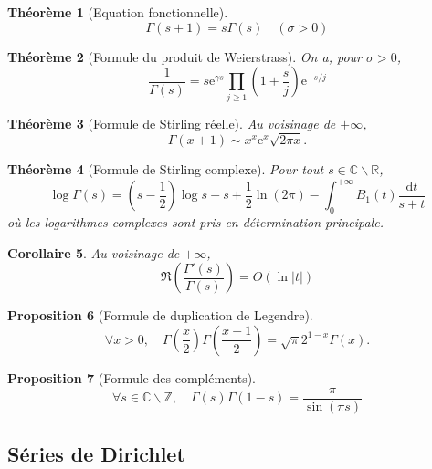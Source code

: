 \documentclass[french]{report}
\newtheorem{theorem}{Théorème}[section]
\newtheorem{proposition}[theorem]{Proposition}
\newtheorem{corollary}[theorem]{Corollaire}
\begin{document}
\begin{theorem}[Equation fonctionnelle]\label{thm:gamma-equation-fonctionnelle}
  \[
    \Gamma(s+1)=s\Gamma(s)\quad(\sigma>0)
  \]
\end{theorem}

\begin{theorem}[Formule du produit de Weierstrass]\label{thm:gamma-weierstrass}
  On a, pour $\sigma>0$,
  \[
    \frac{1}{\Gamma(s)}
    =s\mathrm{e}^{\gamma s}\prod_{j\geq 1}\left(1+\frac{s}{j}\right)\mathrm{e}^{-s/j}
  \]
\end{theorem}

\begin{theorem}[Formule de Stirling réelle]\label{thm:stirling-reel}
  Au voisinage de $+\infty$,
  \[
    \Gamma(x+1)
    \sim x^x\mathrm{e}^x\sqrt{2\pi x}.
  \]
\end{theorem}

\begin{theorem}[Formule de Stirling complexe]\label{thm:stirling-complexe}
  Pour tout $s\in\mathbb{C}\backslash\mathbb{R}$,
  \[
    \log\Gamma(s)
    = (s-\frac{1}{2})\log s
    - s
    + \frac{1}{2}\ln(2\pi)
    - \int_0^{+\infty} B_1(t)\frac{\mathrm{d}t}{s+t}
  \]
  où les logarithmes complexes sont pris en détermination principale.
\end{theorem}

\begin{corollary}\label{cor:gamma-gamma-prime-majoration}
  Au voisinage de $+\infty$,
  \[
    \Re\left(\frac{\Gamma'(s)}{\Gamma(s)}\right) = O(\ln|t|)
  \]
\end{corollary}

\begin{proposition}[Formule de duplication de Legendre]\label{prop:gamma-duplication-legendre}
  \[
    \forall x>0,\quad
    \Gamma\left(\frac{x}{2}\right)\Gamma\left(\frac{x+1}{2}\right)
    =\sqrt{\pi}2^{1-x}\Gamma(x).
  \]
\end{proposition}

\begin{proposition}[Formule des compléments]\label{prop:gamma-formule-complements}
  \[
    \forall s\in\mathbb{C}\backslash\mathbb{Z},\quad
    \Gamma(s)\Gamma(1-s)=\frac{\pi}{\sin(\pi s)}
  \]
\end{proposition}

\subsection{Séries de Dirichlet}
\end{document}

